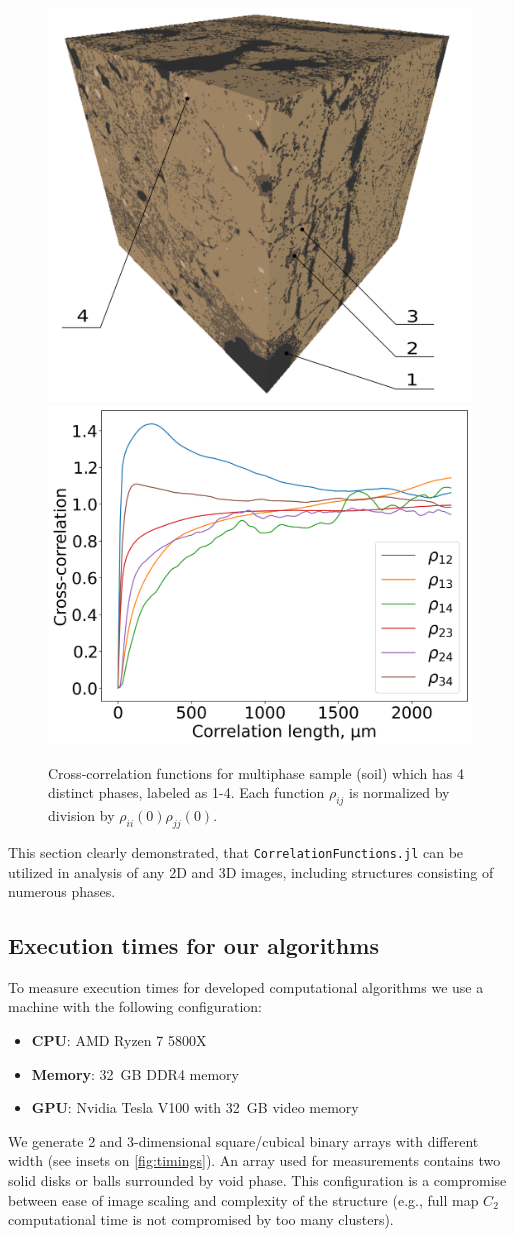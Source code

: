 \documentclass[1p]{elsarticle}
\newcommand{\code}[1]{\colorbox{light-gray}{\texttt{#1}}}
\begin{document}
\begin{figure}[ht]
  \centering
  \includegraphics[width=0.45\linewidth]{samples/multiphase.png}
  \includegraphics[width=0.45\linewidth]{samples/multiphase-cc.png}
  \caption[]{Cross-correlation functions for multiphase sample (soil) which has
    4 distinct phases, labeled as 1-4. Each function $\rho_{ij}$ is normalized
    by division by $\rho_{ii}(0) \rho_{jj}(0)$.}
  \label{fig:real-multiphase}
\end{figure}

This section clearly demonstrated, that \code{CorrelationFunctions.jl} can be
utilized in analysis of any 2D and 3D images, including structures consisting of
numerous phases.

\subsection{Execution times for our algorithms}
\label{sec:efficiency}
To measure execution times for developed computational algorithms we use a
machine with the following configuration:
\begin{itemize}
\item \textbf{CPU}: AMD Ryzen 7 5800X
\item \textbf{Memory}: 32~GB DDR4 memory
\item \textbf{GPU}: Nvidia Tesla V100 with 32~GB video memory
\end{itemize}

We generate 2 and 3-dimensional square/cubical binary arrays with different
width (see insets on \cref{fig:timings}). An array used for measurements
contains two solid disks or balls surrounded by void phase. This configuration
is a compromise between ease of image scaling and complexity of the structure
(e.g., full map $C_2$ computational time is not compromised by too many
clusters).
\end{document}
